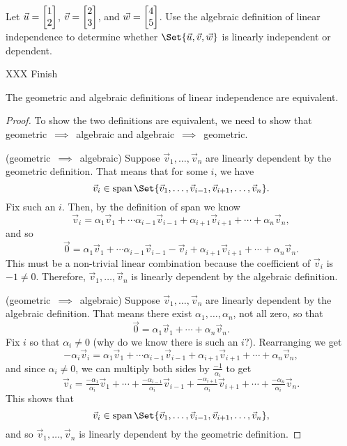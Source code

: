 \begin{example}
	Let $\vec u=\mat{1\\2}$, $\vec v=\mat{2\\3}$, and $\vec w=\mat{4\\5}$. Use the algebraic definition
	of linear independence to determine whether
	$\Set{\vec u,\vec v,\vec w}$ is linearly independent or dependent.


	XXX Finish
\end{example}


\begin{theorem}
	The geometric and algebraic definitions of linear independence are equivalent.
\end{theorem}
\begin{proof}
	To show the two definitions are equivalent, we need to show that geometric~$\implies$~algebraic
	and algebraic~$\implies$~geometric.

	\medskip
	\noindent
	(geometric~$\implies$~algebraic) Suppose $\vec v_1,\ldots,\vec v_n$ are linearly dependent by the 
	geometric definition. That means that for some $i$, we have
	\[
		\vec v_i \in \Span\Set{\vec v_1,\ldots,\vec v_{i-1},\vec v_{i+1},\ldots,\vec v_n}.
	\]
	Fix such an $i$. Then, by the definition of span we know
	\[
		\vec v_i=\alpha_1\vec v_1+\cdots \alpha_{i-1}\vec v_{i-1}+\alpha_{i+1}\vec v_{i+1}+\cdots +\alpha_n\vec v_n,
	\]
	and so
	\[
		\vec 0=\alpha_1\vec v_1+\cdots \alpha_{i-1}\vec v_{i-1}-\vec v_i+\alpha_{i+1}\vec v_{i+1}+\cdots +\alpha_n\vec v_n.
	\]
	This must be a non-trivial linear combination because the coefficient of $\vec v_i$ is $-1\neq 0$. Therefore, 
	$\vec v_1,\ldots,\vec v_n$ is linearly dependent by the algebraic definition.
	
	\medskip
	\noindent
	(geometric~$\implies$~algebraic) Suppose $\vec v_1,\ldots,\vec v_n$ are linearly dependent by the 
	algebraic definition. That means there exist $\alpha_1,\ldots,\alpha_n$, not all zero, so that
	\[
		\vec 0=\alpha_1\vec v_1+\cdots +\alpha_n\vec v_n.
	\]
	Fix $i$ so that $\alpha_i\neq 0$ (why do we know there is such an $i$?). Rearranging we get
	\[
		-\alpha_i\vec v_i=\alpha_1\vec v_1+\cdots \alpha_{i-1}\vec v_{i-1}+\alpha_{i+1}\vec v_{i+1}+\cdots +\alpha_n\vec v_n,
	\]
	and since $\alpha_i\neq 0$, we can multiply both sides by $\frac{-1}{\alpha_i}$ to get
	\[
		\vec v_i=\tfrac{-\alpha_1}{\alpha_i}\vec v_1+\cdots +\tfrac{-\alpha_{i-1}}{\alpha_i}\vec v_{i-1}
	+\tfrac{-\alpha_{i+1}}{\alpha_i}\vec v_{i+1}+\cdots +\tfrac{-\alpha_n}{\alpha_i}\vec v_n.
	\]
	This shows that
	\[
		\vec v_i \in \Span\Set{\vec v_1,\ldots,\vec v_{i-1},\vec v_{i+1},\ldots,\vec v_n},
	\]
	and so $\vec v_1,\ldots,\vec v_n$ is linearly dependent by the geometric definition.
\end{proof}

